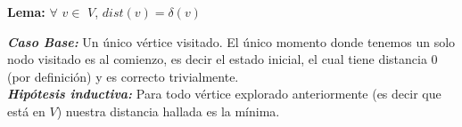 
\begin{center}
\textbf{Lema: } $\forall$ $v \in$ $V$, $dist(v) = \delta(v)$
\end{center}

\emph{\textbf{Caso Base: }}  Un único vértice visitado. El único momento donde tenemos un solo nodo visitado es al comienzo, es decir
el estado inicial, el cual tiene distancia 0 (por definición) y es correcto trivialmente.
\\

\emph{\textbf{Hipótesis inductiva: }} Para todo vértice explorado anteriormente (es decir que está en $V$) nuestra distancia hallada es la mínima.
\\

